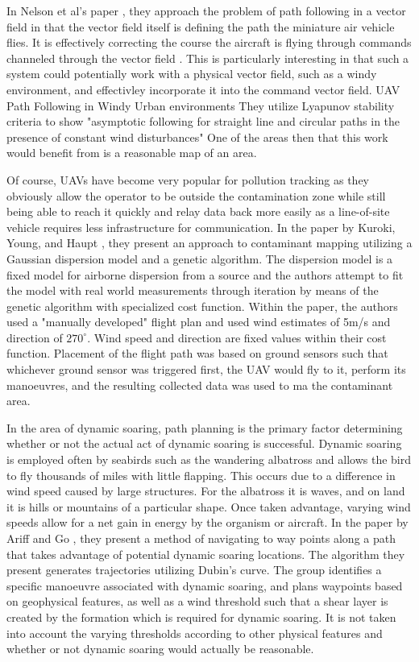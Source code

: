 \documentclass[12pt]{report}
\begin{document}
In Nelson et al's paper \cite{Nelson07}, they approach the problem of path following in a vector field in that the vector field itself is defining the path the miniature air vehicle flies. It is effectively correcting the course the aircraft is flying through commands channeled through the vector field \cite{Nelson07}. This is particularly interesting in that such a system could potentially work with a physical vector field, such as a windy environment, and effectivley incorporate it into the command vector field. 
UAV Path Following in Windy Urban environments
They utilize Lyapunov stability criteria to show "asymptotic following for straight line and circular paths in the presence of constant wind disturbances" One of the areas then that this work would benefit from is a reasonable map of an area.

Of course, UAVs have become very popular for pollution tracking as they obviously allow the operator to be outside the contamination zone while still being able to reach it quickly and relay data back more easily as a line-of-site vehicle requires less infrastructure for communication. In the paper by Kuroki, Young, and Haupt \cite{Kuroki09}, they present an approach to contaminant mapping utilizing a Gaussian dispersion model and a genetic algorithm. The dispersion model is a fixed model for airborne dispersion from a source and the authors attempt to fit the model with real world measurements through iteration by means of the genetic algorithm with specialized cost function. Within the paper, the authors used a "manually developed" flight plan and used wind estimates of 5m/s and direction of $270^\circ$. Wind speed and direction are fixed values within their cost function. Placement of the flight path was based on ground sensors such that whichever ground sensor was triggered first, the UAV would fly to it, perform its manoeuvres, and the resulting collected data was used to ma the contaminant area. 

In the area of dynamic soaring, path planning is the primary factor determining whether or not the actual act of dynamic soaring is successful. Dynamic soaring is employed often by seabirds such as the wandering albatross and allows the bird to fly thousands of miles with little flapping. This occurs due to a difference in wind speed caused by large structures. For the albatross it is waves, and on land it is hills or mountains of a particular shape. Once taken advantage, varying wind speeds allow for a net gain in energy by the organism or aircraft. In the paper by Ariff and Go \cite{Ariff11}, they present a method of navigating to way points along a path that takes advantage of potential dynamic soaring locations. The algorithm they present generates trajectories utilizing Dubin's curve. The group identifies a specific manoeuvre associated with dynamic soaring, and plans waypoints based on geophysical features, as well as a wind threshold such that a shear layer is created by the formation which is required for dynamic soaring. It is not taken into account the varying thresholds according to other physical features and whether or not dynamic soaring would actually be reasonable. 
\end{document}
